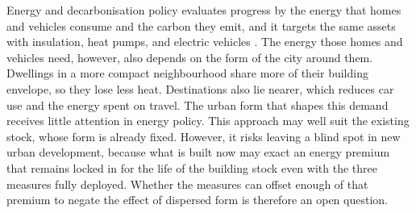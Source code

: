\documentclass[pdflatex,sn-nature]{sn-jnl}
\begin{document}
Energy and decarbonisation policy evaluates progress by the energy that homes and vehicles consume and the carbon they emit, and it targets the same assets with insulation, heat pumps, and electric vehicles \citep{ukgovernment2023,ccc2025}. The energy those homes and vehicles need, however, also depends on the form of the city around them. Dwellings in a more compact neighbourhood share more of their building envelope, so they lose less heat. Destinations also lie nearer, which reduces car use and the energy spent on travel. The urban form that shapes this demand receives little attention in energy policy. This approach may well suit the existing stock, whose form is already fixed. However, it risks leaving a blind spot in new urban development, because what is built now may exact an energy premium that remains locked in for the life of the building stock even with the three measures fully deployed. Whether the measures can offset enough of that premium to negate the effect of dispersed form is therefore an open question.
\end{document}
